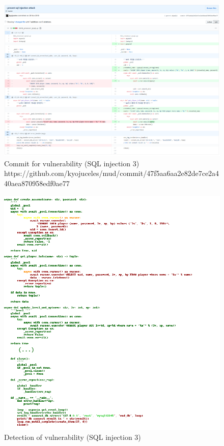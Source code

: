 \documentclass[
a4paper,
pagesize,
pdftex,
12pt,
twoside, %
BCOR=5mm, %
ngerman,
fleqn,
final,
]{scrartcl}
\begin{document}
\begin{figure}[H]
	\centering
	\includegraphics[width=\linewidth]{Images/sqlC}
	\caption{Commit for vulnerability (SQL injection 3) \newline \scriptsize{https://github.com/kyojuceles/mud/commit/47f5aa6aa2e82de7ce2a440aea870958edf0ae77}}
	\label{fig:sqlC}
\end{figure}
\begin{figure}[H]
	\centering
	\includegraphics[width=\linewidth]{Images/sqlCr}
	\caption{Detection of vulnerability (SQL injection 3)}
	\label{fig:sqlCr}
\end{figure}
\end{document}
